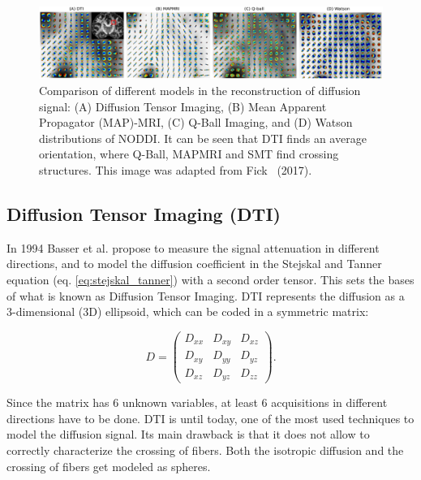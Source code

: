 \begin{figure}[h]
    \includegraphics[width=\textwidth]{3.mri/img/models.png}
    \caption{Comparison of different models in the reconstruction of diffusion
             signal: (A) Diffusion Tensor Imaging, (B) Mean Apparent Propagator (MAP)-MRI,
             (C) Q-Ball Imaging, and (D) Watson distributions of NODDI. It can
             be seen that DTI finds an
             average orientation, where Q-Ball, MAPMRI and SMT find crossing
             structures. This image was adapted from Fick~\cite{Fick2017} (2017).}
     \label{fig:dwi_models}
\end{figure}

\subsection{Diffusion Tensor Imaging (DTI)}
\label{sec:dti}
In 1994 Basser et al. \cite{Basser1994} propose to measure the signal attenuation
in different directions, and to model the diffusion coefficient in the Stejskal and
Tanner equation (eq. \ref{eq:stejskal_tanner}) with a second order tensor. This
sets the bases of what is known as Diffusion Tensor Imaging. DTI represents the
diffusion as a 3-dimensional (3D) ellipsoid, which can be coded in a symmetric
matrix:

$$
    D =
    \begin{pmatrix}
             D_{xx} & D_{xy} & D_{xz} \\
             D_{xy} & D_{yy} & D_{yz} \\
             D_{xz} & D_{yz} & D_{zz} 
    \end{pmatrix}.
$$

Since the matrix has 6 unknown variables, at least 6 acquisitions in different
directions have to be done. DTI is until today, one
of the most used techniques to model the diffusion signal. Its main drawback
is that it does not allow to correctly characterize the crossing of fibers. Both
the isotropic diffusion and the crossing of fibers get modeled as spheres.

